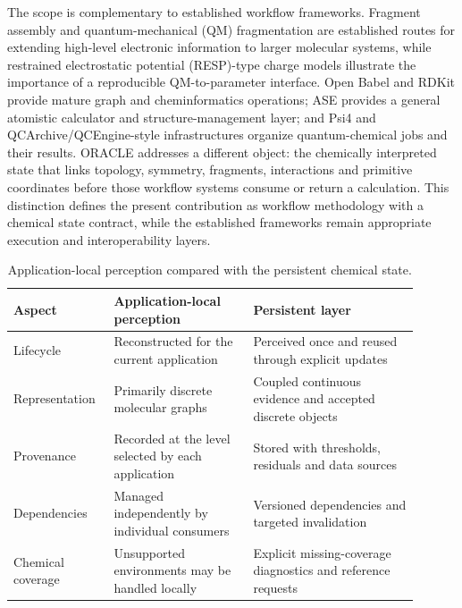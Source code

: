 \documentclass[journal=jctcce,manuscript=article]{achemso}
\begin{document}
The scope is complementary to established workflow frameworks.  Fragment
assembly and quantum-mechanical (QM) fragmentation are established routes for extending
high-level electronic information to larger molecular systems, while restrained electrostatic potential (RESP)-type
charge models illustrate the importance of a reproducible QM-to-parameter
interface.\cite{kitaura_1999_fmo,bayly_1993_resp}  Open Babel
and RDKit provide mature graph and cheminformatics operations; ASE provides a
general atomistic calculator and structure-management layer; and Psi4 and
QCArchive/QCEngine-style infrastructures organize quantum-chemical jobs and
their results.\cite{openbabel_2011,rdkit_book_2026,ase_2017,psi4_2020} ORACLE
addresses a different object: the chemically interpreted state that links
topology, symmetry, fragments, interactions and primitive coordinates before
those workflow systems consume or return a calculation.  This distinction
defines the present contribution as workflow methodology with a chemical state
contract, while the established frameworks remain appropriate execution and
interoperability layers.

\begin{table}[htbp]
\centering
\caption{Application-local perception compared with the persistent chemical state.}
\label{tab:persistent-distinction}
\small
\renewcommand{\arraystretch}{1.12}
\begin{tabular}{
>{\raggedright\arraybackslash}p{0.20\linewidth}
>{\raggedright\arraybackslash}p{0.32\linewidth}
>{\raggedright\arraybackslash}p{0.38\linewidth}}
\hline
\textbf{Aspect} & \textbf{Application-local perception} & \textbf{Persistent layer}\\
\hline
Lifecycle & Reconstructed for the current application &
Perceived once and reused through explicit updates\\
\hline
Representation & Primarily discrete molecular graphs &
Coupled continuous evidence and accepted discrete objects\\
\hline
Provenance & Recorded at the level selected by each application &
Stored with thresholds, residuals and data sources\\
\hline
Dependencies & Managed independently by individual consumers &
Versioned dependencies and targeted invalidation\\
\hline
Chemical coverage & Unsupported environments may be handled locally &
Explicit missing-coverage diagnostics and reference requests\\
\hline
\end{tabular}
\end{table}
\end{document}
